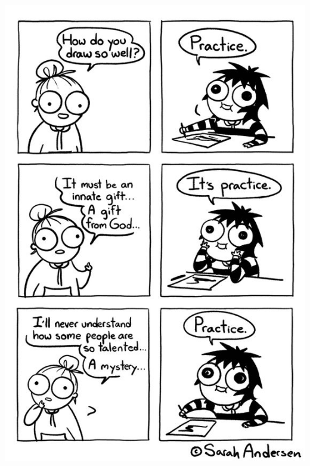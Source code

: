 \documentclass[fontsize=10pt,a4paper]{scrbook}
\begin{document}
\begin{center}


\includegraphics[width=\textwidth]{book/practicarPIC.jpeg}
\end{center}
\newpage
\vspace*{2.0cm}
\newpage


\dominitoc%
\tableofcontents





\end{document}
